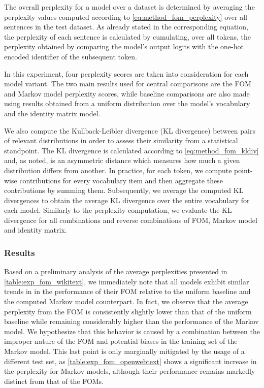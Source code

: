 The overall perplexity for a model over a dataset is determined by averaging the perplexity values computed according to \cref{eq:method_fom_perplexity} over all sentences in the test dataset.
As already stated in the corresponding equation, the perplexity of each sentence is calculated by cumulating, over all tokens, the perplexity obtained by comparing the model's output logits with the one-hot encoded identifier of the subsequent token.

In this experiment, four perplexity scores are taken into consideration for each model variant.
The two main results used for central comparisons are the FOM and Markov model perplexity scores, while baseline comparisons are also made using results obtained from a uniform distribution over the model's vocabulary and the identity matrix model.

We also compute the Kullback-Leibler divergence (KL divergence) between pairs of relevant distributions in order to assess their similarity from a statistical standpoint.
The KL divergence is calculated according to \cref{eq:method_fom_kldiv} and, as noted, is an asymmetric distance which measures how much a given distribution differs from another.
In practice, for each token, we compute point-wise contributions for every vocabulary item and then aggregate these contributions by summing them.
Subsequently, we average the computed KL divergences to obtain the average KL divergence over the entire vocabulary for each model.
Similarly to the perplexity computation, we evaluate the KL divergence for all combinations and reverse combinations of FOM, Markov model and identity matrix. 

\subsubsection{Results}

Based on a preliminary analysis of the average perplexities presented in \cref{table:exp_fom_wikitext}, we immediately note that all models exhibit similar trends in in the performance of their FOM relative to the uniform baseline and the computed Markov model counterpart.
In fact, we observe that the average perplexity from the FOM is consistently slightly lower than that of the uniform baseline while remaining considerably higher than the performance of the Markov model.
We hypothesize that this behavior is caused by a combination between the improper nature of the FOM and potential biases in the training set of the Markov model.
This last point is only marginally mitigated by the usage of a different test set, as \cref{table:exp_fom_openwebtext} shows a significant increase in the perplexity for Markov models, although their performance remains markedly distinct from that of the FOMs.


